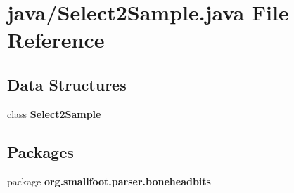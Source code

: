 \section{java/\+Select2\+Sample.java File Reference}
\label{Select2Sample_8java}
\subsection*{Data Structures}
\begin{DoxyCompactItemize}
\item 
class {\bf Select2\+Sample}
\end{DoxyCompactItemize}
\subsection*{Packages}
\begin{DoxyCompactItemize}
\item 
package {\bf org.\+smallfoot.\+parser.\+boneheadbits}
\end{DoxyCompactItemize}
